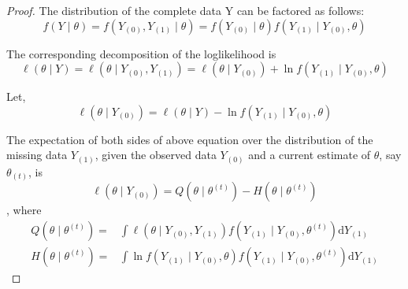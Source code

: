 \begin{proof}
	The distribution of the complete data Y can be factored as follows:
	\begin{equation}
		f(Y \mid \theta)=f\left(Y_{(0)}, Y_{(1)} \mid \theta\right)=f\left(Y_{(0)} \mid \theta\right) f\left(Y_{(1)} \mid Y_{(0)}, \theta\right)
	\end{equation}

	The corresponding decomposition of the loglikelihood is
	\begin{equation}
		\ell(\theta \mid Y)=\ell\left(\theta \mid Y_{(0)}, Y_{(1)}\right)=\ell\left(\theta \mid Y_{(0)}\right)+\ln f\left(Y_{(1)} \mid Y_{(0)}, \theta\right)
	\end{equation}

	Let,
	\begin{equation}
		\ell\left(\theta \mid Y_{(0)}\right)=\ell(\theta \mid Y)-\ln f\left(Y_{(1)} \mid Y_{(0)}, \theta\right)
	\end{equation}

	The expectation of both sides of above equation over the distribution of the missing data $Y_{(1)}$, given the observed data $Y_{(0)}$ and a current estimate of $\theta$, say $\theta_{(t)}$, is
	\begin{equation}
		\ell\left(\theta \mid Y_{(0)}\right)=Q\left(\theta \mid \theta^{(t)}\right)-H\left(\theta \mid \theta^{(t)}\right)
	\end{equation}
	, where
	\begin{equation}
		\begin{aligned}
			Q\left(\theta \mid \theta^{(t)}\right)= & \int\ell\left(\theta \mid Y_{(0)}, Y_{(1)}\right) f\left(Y_{(1)} \mid Y_{(0)}, \theta^{(t)}\right) \mathrm{d} Y_{(1)} \\
			H\left(\theta\mid\theta^{(t)}\right)=   & \int\ln f\left(Y_{(1)}\mid Y_{(0)},\theta\right)f\left(Y_{(1)} \mid Y_{(0)}, \theta^{(t)}\right) \mathrm{d} Y_{(1)}
		\end{aligned}
	\end{equation}


\end{proof}
